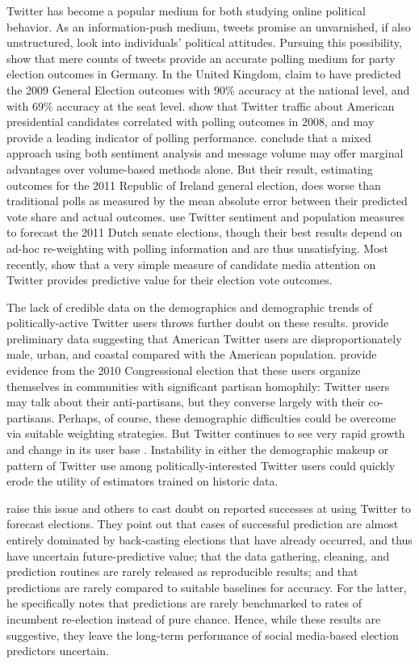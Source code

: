 \documentclass{acm_proc_article-sp}
\begin{document}
Twitter has become a popular medium for both studying online political
behavior. As an information-push medium,
tweets promise an unvarnished, if also unstructured, look into
individuals' political attitudes. Pursuing this possibility, 
\cite{tumasjan2010election} show that mere counts of tweets provide an
accurate polling medium for party election outcomes in
Germany. In the United Kingdom, \cite{tweetminster2010} claim to have
predicted the 2009 General Election outcomes with 90\% accuracy at the
national level, and with 69\% accuracy at the seat
level. \cite{o2010tweets} show
that Twitter traffic about American presidential candidates correlated with
polling outcomes in 2008, and may provide a leading indicator of polling
performance. \cite{bermingham2011using} conclude that a mixed approach
using both sentiment analysis and message volume may offer marginal
advantages over volume-based methods alone. But their result,
estimating outcomes for the 2011 Republic of Ireland general election,
does worse than traditional polls as measured by the mean absolute
error between their predicted vote share and actual outcomes. \cite{sang2012predicting} use Twitter sentiment and population
measures to forecast the 2011 Dutch senate elections, though their
best results depend on ad-hoc re-weighting with polling information and
are thus unsatisfying. Most
recently, \cite{digrazia2013} show that a very simple measure of candidate media
attention on Twitter provides predictive value for their election vote
outcomes. 

The lack of credible data on the demographics and demographic trends
of politically-active Twitter users throws further doubt on these
results. \cite{mislove2011understanding} provide preliminary data
suggesting that American Twitter users are disproportionately male,
urban, and coastal compared with the American
population. \cite{conover2011} provide evidence from the 2010
Congressional election that these users organize themselves in
communities with significant partisan homophily: Twitter users may
talk about their anti-partisans, but they converse largely with their
co-partisans. Perhaps, of course, these demographic difficulties could
be overcome via suitable weighting strategies. But Twitter continues
to see very rapid growth and change in its user
base \cite{gwi2013,thenextweb2013}. Instability in either the demographic makeup
or pattern of Twitter use among politically-interested Twitter users
could quickly erode the utility of estimators trained on historic
data.

\cite{gayo2011limits} raise this issue and others to
cast doubt on reported successes at using Twitter
to forecast elections. They point out that cases of successful
prediction are almost entirely dominated by back-casting elections
that have already occurred, and thus have uncertain future-predictive
value; that the data gathering, cleaning, and prediction routines are
rarely released as reproducible results; and that predictions are
rarely compared to suitable baselines for accuracy. For the latter, he
specifically notes that predictions are rarely benchmarked to rates of
incumbent re-election instead of pure chance. Hence, while these
results are suggestive, they leave the long-term performance of social
media-based election predictors uncertain.
\end{document}
